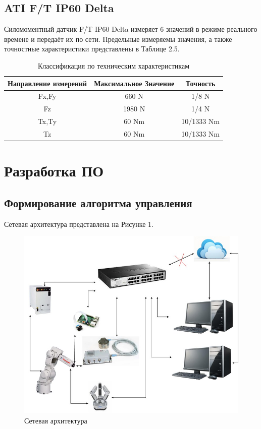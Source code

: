 \documentclass[a4paper,14pt,russian]{extreport} \usepackage{extsizes}
\begin{document}
	\section{ATI F/T IP60 Delta}
	Силомоментный датчик F/T IP60 Delta измеряет 6 значений в режиме реального времене и передаёт их по сети. Предельные измеряемы значения, а также точностные характеристики представлены в Таблице 2.5.
	
	 \begin{table}[h]
	 	\caption{Классификация по техническим характеристикам} 
	 	\label{tab_kaw_klass}
	 	\centering
	 	\begin{tabular}{|c|c|c|}	
	 		\hline Направление измерений & 	Максимальное Значение & 	Точность \\
	 		     \hline Fx,Fy & 	 660 N  & 	 1/8 N \\
	 		     \hline Fz	 & 	   1980 N   & 	1/4 N \\
	 		     \hline Tx,Ty & 		60 Nm & 		10/1333 Nm \\
	 		    \hline  Tz	 & 	 60 Nm   & 	10/1333 Nm \\				
	 		\hline
	 	\end{tabular} 
	 \end{table}
	
	
		\chapter{Разработка ПО}
		\section{Формирование алгоритма управления}
		Сетевая архитектура представлена на Рисунке 1.
		\begin{figure}[h]
			\centering		 
			\includegraphics[width=5.5in]{./img/img42.jpg}	
			\caption{Сетевая архитектура}
			\label{fig_img511}
		\end{figure}
		
\end{document}
